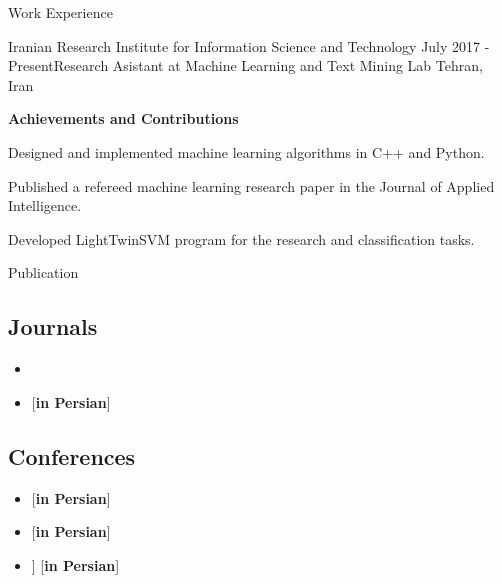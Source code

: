 \documentclass{resume} %
\newcommand{\perspaper}{[\textbf{in Persian}]}
\begin{document}

\begin{rSection}{Work Experience}

\begin{rSubsection}{Iranian Research Institute for Information Science and Technology }{July 2017 - Present}{Research Asistant at Machine Learning and Text Mining Lab }{Tehran, Iran}
	
\textbf{Achievements and Contributions}
\item Designed and implemented machine learning algorithms in C++ and Python.
\item Published a refereed machine learning research paper in the Journal of Applied Intelligence.
\item Developed LightTwinSVM program for the research and classification tasks.
\end{rSubsection}


\end{rSection}

\begin{rSection}{Publication}
\subsection*{Journals}
\begin{itemize}
	\item {}
	\item {} \perspaper
\end{itemize}

\subsection*{Conferences}
\begin{itemize}
	\item {} \perspaper
	\item {} \perspaper
	\item {} ] \perspaper
\end{itemize}	
\end{rSection}

\clearpage
\end{document}
